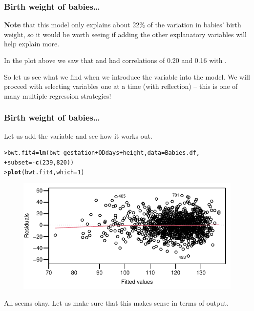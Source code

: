\documentclass{beamer}\usepackage[]{graphicx}\usepackage[]{xcolor}
\makeatletter
\newcommand{\hlnum}[1]{\textcolor[rgb]{0.686,0.059,0.569}{#1}}%
\newcommand{\hlopt}[1]{\textcolor[rgb]{0,0,0}{#1}}%
\newcommand{\hlstd}[1]{\textcolor[rgb]{0.345,0.345,0.345}{#1}}%
\newcommand{\hlkwb}[1]{\textcolor[rgb]{0.69,0.353,0.396}{#1}}%
\newcommand{\hlkwc}[1]{\textcolor[rgb]{0.333,0.667,0.333}{#1}}%
\newcommand{\hlkwd}[1]{\textcolor[rgb]{0.737,0.353,0.396}{\textbf{#1}}}%
\newenvironment{kframe}{%
 \def\at@end@of@kframe{}%
 \ifinner\ifhmode%
  \def\at@end@of@kframe{\end{minipage}}%
  \begin{minipage}{\columnwidth}%
 \fi\fi%
 \def\FrameCommand##1{\hskip\@totalleftmargin \hskip-\fboxsep
 \colorbox{shadecolor}{##1}\hskip-\fboxsep
     \hskip-\linewidth \hskip-\@totalleftmargin \hskip\columnwidth}%
 \MakeFramed {\advance\hsize-\width
   \@totalleftmargin\z@ \linewidth\hsize
   \@setminipage}}%
 {\par\unskip\endMakeFramed%
 \at@end@of@kframe}
\newenvironment{knitrout}{}{} %
\makeatother
\begin{document}
\begin{frame}[fragile]
\frametitle{Birth weight of babies\ldots}
\textbf{Note} that this model only explains about 22\% of the variation in babies' birth weight, so it would be worth seeing if adding the other explanatory variables will help explain more.

\bigskip
In the  plot above we saw that  and  had
correlations of 0.20 and 0.16 with .

\bigskip
So let us see what we find when we introduce the  variable into the model. We will proceed with selecting variables one at a time (with reflection)  --  this is one of many multiple regression strategies!

\end{frame}





\begin{frame}[fragile]
\frametitle{Birth weight of babies\ldots}
Let us add the  variable and see how it works out.
\begin{knitrout}\scriptsize
{}\color{fgcolor}\begin{kframe}
\begin{alltt}
\hlstd{> }\hlstd{bwt.fit4} \hlkwb{=} \hlkwd{lm}\hlstd{(bwt} \hlopt{~} \hlstd{gestation} \hlopt{+} \hlstd{ODdays} \hlopt{+} \hlstd{height,} \hlkwc{data} \hlstd{= Babies.df,}
\hlstd{+ }    \hlkwc{subset} \hlstd{=} \hlopt{-}\hlkwd{c}\hlstd{(}\hlnum{239}\hlstd{,}\hlnum{820}\hlstd{))}
\hlstd{> }\hlkwd{plot}\hlstd{(bwt.fit4,}\hlkwc{which}\hlstd{=}\hlnum{1}\hlstd{)}
\end{alltt}
\end{kframe}
\end{knitrout}



\begin{figure}
  \centering
  \includegraphics{figure/RC-H10-034}
\end{figure}

All seems okay. Let us make sure that this makes sense in terms of output.
\end{frame}
\end{document}
